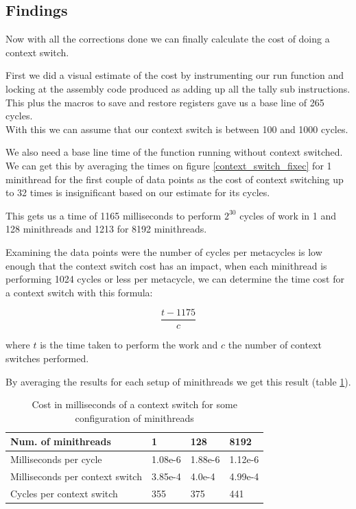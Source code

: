 \documentclass[12pt,a4paper]{report}
\begin{document}
\subsection{Findings}
Now with all the corrections done we can finally calculate the cost of doing a context switch.

First we did a visual estimate of the cost by instrumenting our run function and locking at the assembly code produced as adding up all the tally sub instructions. This plus the macros to save and restore registers gave us a base line of 265 cycles. \\
With this we can assume that our context switch is between 100 and 1000 cycles.

We also need a base line time of the function running without context switched. We can get this by averaging the times on figure \ref{context_switch_fixec} for 1 minithread for the first couple of data points as the cost of context switching up to 32 times is insignificant based on our estimate for its cycles.

This gets us a time of 1165 milliseconds to perform $2^{30}$ cycles of work in 1 and 128 minithreads and 1213 for 8192 minithreads.

Examining the data points were the number of cycles per metacycles is low enough that the context switch cost has an impact, when each minithread is performing 1024 cycles or less per metacycle, we can determine the time cost for a context switch with this formula: 

\begin{equation}
    \frac{t - 1175}{c}
\end{equation}

where $t$ is the time taken to perform the work and $c$ the number of context switches performed.

By averaging the results for each setup of minithreads we get this result (table \ref{cost_context_switch}).

\begin{table}[]
\begin{tabular}{llll}
Num. of minithreads & 1      & 128    & 8192   \\ \hline
Milliseconds per cycle & 1.08e-6 & 1.88e-6 & 1.12e-6 \\
Milliseconds per context switch      & 3.85e-4 & 4.0e-4 & 4.99e-4 \\ 
Cycles per context switch & 355 & 375 & 441
\end{tabular}
\caption{Cost in milliseconds of a context switch for some configuration of minithreads}
\label{cost_context_switch}
\end{table}
\end{document}
